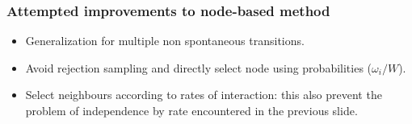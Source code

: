 \documentclass{beamer}
\begin{document}
	\begin{frame}
	\frametitle{Attempted improvements to node-based method}

	\begin{itemize}
		\item Generalization for multiple non spontaneous transitions.
		\item Avoid rejection sampling and directly select node using probabilities ($\omega_i/W$).
		\item Select neighbours according to rates of interaction: this also prevent the problem of independence by rate encountered in the previous slide.
	\end{itemize}
	\vspace{5 pt}
	
	\end{frame}


	
	
\end{document}
